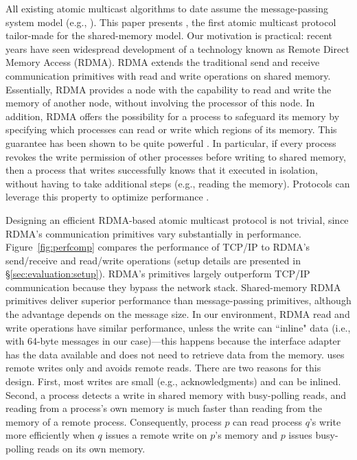 All existing atomic multicast algorithms to date assume the message-passing system model (e.g., \cite{Coelho2017,gotsman2019white,birman1987reliable, delporte2000fault, bezerra2015ridge,
marandi2012multi}).
This paper presents \libname, the first atomic multicast protocol tailor-made for the shared-memory model.
Our motivation is practical: recent years have seen widespread development of a technology known as Remote Direct Memory Access (RDMA).
RDMA extends the traditional send and receive communication primitives with read and write operations on shared memory.
Essentially, RDMA provides a node with the capability to read and write the memory of another node, without involving the processor of this node.
In addition, RDMA offers the possibility for a process to safeguard its memory by specifying which processes can read or write which regions of its memory.
This guarantee has been shown to be quite powerful \cite{Aguilera2019}.
In particular, if every process revokes the write permission of other processes before writing to shared memory, then a process that writes successfully knows that it executed in isolation, without having to take additional steps (e.g., reading the memory). 
Protocols can leverage this property to optimize performance \cite{Aguilera2019}.

Designing an efficient RDMA-based atomic multicast protocol is not trivial, since RDMA's communication primitives vary substantially in performance.
Figure~\ref{fig:perfcomp} compares the performance of TCP/IP to RDMA's send/receive and read/write operations (setup details are presented in \S\ref{sec:evaluation:setup}).
RDMA's primitives largely outperform TCP/IP communication because they bypass the network stack.
Shared-memory RDMA primitives deliver superior performance than message-passing primitives, although the advantage depends on the message size.
In our environment, RDMA read and write operations have similar performance, unless the write can ``inline" data (i.e., with 64-byte messages in our case)---this happens because the interface adapter has the data available and does not need to retrieve data from the memory.
\libname uses remote writes only and avoids remote reads.
There are two reasons for this design.
First, most writes are small (e.g., acknowledgments) and can be inlined.
Second, a process detects a write in shared memory with busy-polling reads, and reading from a process's own memory is much faster than reading from the memory of a remote process.
Consequently, process $p$ can read process $q$'s write more efficiently when $q$ issues a remote write on $p$'s memory and $p$ issues busy-polling reads on its own memory.  

